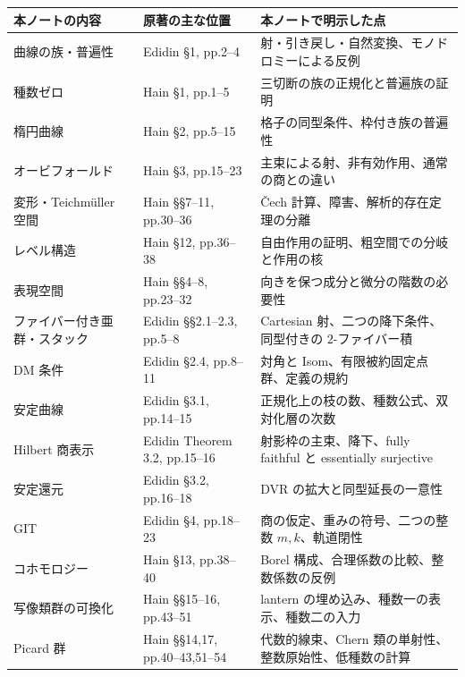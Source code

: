 \documentclass[dvipdfmx,a4paper,11pt]{article}
\theoremstyle{definition}
\begin{document}
\small
\begin{longtable}{p{}p{}p{}}
\toprule
本ノートの内容 & 原著の主な位置 & 本ノートで明示した点\\
\midrule\endhead
曲線の族・普遍性 & Edidin \S1, pp.2--4 & 射・引き戻し・自然変換、モノドロミーによる反例\\
種数ゼロ & Hain \S1, pp.1--5 & 三切断の族の正規化と普遍族の証明\\
楕円曲線 & Hain \S2, pp.5--15 & 格子の同型条件、枠付き族の普遍性\\
オービフォールド & Hain \S3, pp.15--23 & 主束による射、非有効作用、通常の商との違い\\
変形・Teichmüller 空間 & Hain \S\S7--11, pp.30--36 & Čech 計算、障害、解析的存在定理の分離\\
レベル構造 & Hain \S12, pp.36--38 & 自由作用の証明、粗空間での分岐と作用の核\\
表現空間 & Hain \S\S4--8, pp.23--32 & 向きを保つ成分と微分の階数の必要性\\
ファイバー付き亜群・スタック & Edidin \S\S2.1--2.3, pp.5--8 & Cartesian 射、二つの降下条件、同型付きの $2$-ファイバー積\\
DM 条件 & Edidin \S2.4, pp.8--11 & 対角と Isom、有限被約固定点群、定義の規約\\
安定曲線 & Edidin \S3.1, pp.14--15 & 正規化上の枝の数、種数公式、双対化層の次数\\
Hilbert 商表示 & Edidin Theorem 3.2, pp.15--16 & 射影枠の主束、降下、fully faithful と essentially surjective\\
安定還元 & Edidin \S3.2, pp.16--18 & DVR の拡大と同型延長の一意性\\
GIT & Edidin \S4, pp.18--23 & 商の仮定、重みの符号、二つの整数 $m,k$、軌道閉性\\
コホモロジー & Hain \S13, pp.38--40 & Borel 構成、合理係数の比較、整数係数の反例\\
写像類群の可換化 & Hain \S\S15--16, pp.43--51 & lantern の埋め込み、種数一の表示、種数二の入力\\
Picard 群 & Hain \S\S14,17, pp.40--43,51--54 & 代数的線束、Chern 類の単射性、整数原始性、低種数の計算\\
\bottomrule
\end{longtable}
\normalsize
\end{document}
